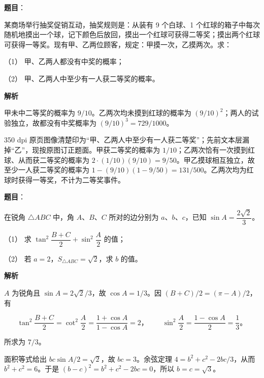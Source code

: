 \begin{answer}

\textbf{题目}：

某商场举行抽奖促销互动，抽奖规则是：从装有 9 个白球、1 个红球的箱子中每次随机地摸出一个球，记下颜色后放回，摸出一个红球可获得二等奖；摸出两个红球可获得一等奖。现有甲、乙两位顾客，规定：甲摸一次，乙摸两次。求：

（1） 甲、乙两人都没有中奖的概率；

（2） 甲、乙两人中至少有一人获二等奖的概率。

\textbf{解析}


甲未中二等奖的概率为 $9/10$。乙两次均未摸到红球的概率为 $(9/10)^2$；两人的试验独立，故都没有中奖概率为 $(9/10)^3=729/1000$。


350 dpi 原页图像清楚印为“甲、乙两人中至少有一人获二等奖”；先前文本层漏掉“乙”，现按原图订正题面。甲获二等奖的概率为 $1/10$；乙两次恰有一次摸到红球、从而获二等奖的概率为 $2\cdot(1/10)(9/10)=9/50$。甲乙摸球相互独立，故至少一人获二等奖的概率为 $1-(9/10)(1-9/50)=131/500$。乙两次均为红球时获得一等奖，不计为二等奖事件。



\end{answer}
\begin{answer}

\textbf{题目}：

在锐角 $\triangle ABC$ 中，角 $A\text{、}B\text{、}C$ 所对的边分别为 $a\text{、}b\text{、}c$，已知 $\sin A=\dfrac{2\sqrt2}{3}$。

（1） 求 $\tan^2\dfrac{B+C}{2}+\sin^2\dfrac A2$ 的值；

（2） 若 $a=2\text{，}S_{\triangle ABC}=\sqrt2$，求 $b$ 的值。

\textbf{解析}


$A$ 为锐角且 $\sin A=2\sqrt2/3$，故 $\cos A=1/3$。因 $(B+C)/2=(\pi-A)/2$，有

\nopagebreak[4]
\[\tan^2\frac{B+C}{2}=\cot^2\frac A2=\frac{1+\cos A}{1-\cos A}=2\text{，}\qquad \sin^2\frac A2=\frac{1-\cos A}{2}=\frac13\text{。}\]

所求为 $7/3$。


面积等式给出 $bc\sin A/2=\sqrt2$，故 $bc=3$。余弦定理 $4=b^2+c^2-2bc/3$，从而 $b^2+c^2=6$。于是 $(b-c)^2=b^2+c^2-2bc=0$，所以 $b=c=\sqrt3$。



\end{answer}
